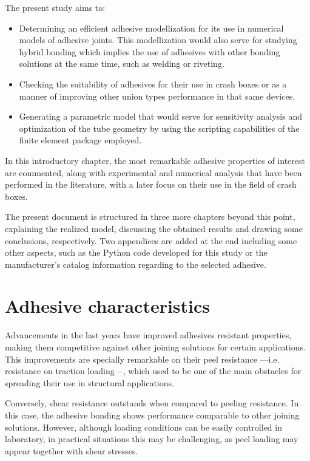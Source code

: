 \documentclass[
documentsize = a4, %
font = cmr, %
typesize = 11, %
printmode = true,
onehalfspacing = true,
language = en, %
titlepage = udciccp, %
degree = pt, %
dedication = true,
acknowledgements = true,
abstract-en = true,
abstract-es = false,
abstract-ga = false,
epigraphs = true,
toc = true,
lof = true,
lot = true,
frontmatterintoc = false,
notation = false,
minimal = false,
]{UDCthesis}
\begin{document}
The present study aims to:

\begin{itemize}
	\item Determining an efficient adhesive modellization for its use in numerical models of adhesive joints. This modellization would also serve for studying hybrid bonding which implies the use of adhesives with other bonding solutions at the same time, such as welding or riveting.

	\item Checking the suitability of adhesives for their use in crash boxes or as a manner of improving other union types performance in that same devices.

	\item Generating a parametric model that would serve for sensitivity analysis and  optimization of the tube geometry by using the scripting capabilities of the finite element package employed.
\end{itemize}

In this introductory chapter, the most remarkable adhesive properties of interest are commented, along with experimental and numerical analysis that have been performed in the literature, with a later focus on their use in the field of crash boxes.

The present document is structured in three more chapters beyond this point, explaining the realized model, discussing the obtained results and drawing some conclusions, respectively. Two appendices are added at the end including some other aspects, such as the Python code developed for this study or the manufacturer's catalog information regarding to the selected adhesive.

\section{Adhesive characteristics}
Advancements in the last years have improved adhesives resistant properties, making them competitive against other joining solutions for certain applications. This improvements are specially remarkable on their peel resistance ---i.e. resistance on traction loading---, which used to be one of the main obstacles for spreading their use in structural applications.

Conversely, shear resistance outstands when compared to  peeling resistance. In this case, the adhesive bonding shows performance comparable to other joining solutions. However, although loading conditions can be easily controlled in laboratory, in practical situations this may be challenging, as peel loading may appear together with shear stresses.
\end{document}
